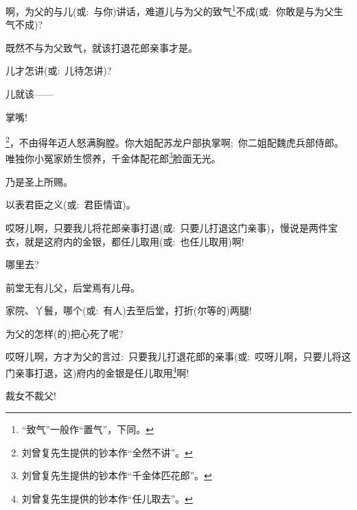 {{啊，为父的与儿({\akai 或}:~与你)讲话，难道儿与为父的致气}\footnote{``致气''一般作``置气''，下同。}{不成({\akai 或}:~你敢是与为父生气不成)?}

{既然不与为父致气，就该打退花郎亲事才是。}

{儿才怎讲({\akai 或}:~儿待怎讲)?}

{儿就该------}

{掌嘴!}

\footnote{刘曾复先生提供的钞本作``全然不讲''。}{，不由得年迈人怒满胸膛。你大姐配苏龙户部执掌啊;~你二姐配魏虎兵部侍郎。唯独你小冤家娇生惯养，千金体配花郎}\footnote{刘曾复先生提供的钞本作``千金体匹花郎''。}{脸面无光。}








{乃是圣上所赐。}

{以表君臣之义({\akai 或}:~君臣情谊)。}

{哎呀儿啊，只要我儿将花郎亲事打退({\akai 或}:~只要儿打退这门亲事)，慢说是两件宝衣，就是这府内的金银，都任儿取用({\akai 或}:~也任儿取用)啊!}

{哪里去?}

前堂无有儿父，后堂焉有儿母。

{家院、丫鬟，哪个({\akai 或}:~有人)去至后堂，打折(尔等的)两腿!}

{为父的怎样(的)把心死了呢?}

{哎呀儿啊，方才为父的言过:~只要我儿打退花郎的亲事({\akai 或}:~哎呀儿啊，只要儿将这门亲事打退，这)府内的金银是任儿取用}\footnote{刘曾复先生提供的钞本作``任儿取去''。}{啊!}

{裁女不裁父!}

}

